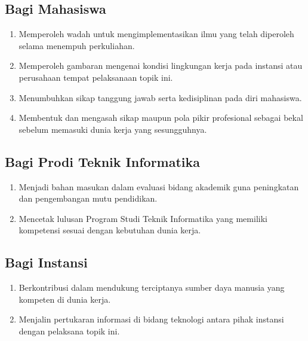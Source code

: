 \subsection{Bagi Mahasiswa}
\begin{enumerate}
    \item Memperoleh wadah untuk mengimplementasikan ilmu yang telah diperoleh selama menempuh perkuliahan.
    \item Memperoleh gambaran mengenai kondisi lingkungan kerja pada instansi atau perusahaan tempat pelaksanaan topik ini.
    \item Menumbuhkan sikap tanggung jawab serta kedisiplinan pada diri mahasiswa.
    \item Membentuk dan mengasah sikap maupun pola pikir profesional sebagai bekal sebelum memasuki dunia kerja yang sesungguhnya.
\end{enumerate}

\subsection{Bagi Prodi Teknik Informatika}
\begin{enumerate}
    \item Menjadi bahan masukan dalam evaluasi bidang akademik guna peningkatan dan pengembangan mutu pendidikan.
    \item Mencetak lulusan Program Studi Teknik Informatika yang memiliki kompetensi sesuai dengan kebutuhan dunia kerja.
\end{enumerate}

\subsection{Bagi Instansi}
\begin{enumerate}
    \item Berkontribusi dalam mendukung terciptanya sumber daya manusia yang kompeten di dunia kerja.
    \item Menjalin pertukaran informasi di bidang teknologi antara pihak instansi dengan pelaksana topik ini.
\end{enumerate}


